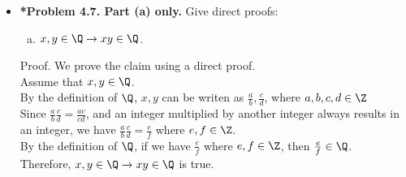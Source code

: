 \documentclass[11pt]{article}
\def\imp{\rightarrow}
\begin{document}
\begin{itemize}
\vspace{0.1in}

\item \textbf{*Problem 4.7. Part (a) only.}
  Give direct proofs:
  \begin{enumerate}[(a)]
  \item $x,y\in\Q\imp xy\in\Q$.
  \end{enumerate}
Proof. We prove the claim using a direct proof.
\\Assume that $x,y\in\Q$.
\\By the definition of $\Q$, $x,y$ can be writen as $\frac{a}{b},\frac{c}{d}$, where $a,b,c,d\in\Z$
\\Since $\frac{a}{b}\frac{c}{d}=\frac{ac}{cd}$, and an integer multiplied by another integer always results in an integer, we have  $\frac{a}{b}\frac{c}{d}=\frac{e}{f}$ where $e,f\in\Z$.
\\By the definition of $\Q$, if we have $\frac{e}{f}$ where $e,f\in\Z$, then $\frac{e}{f}\in\Q$.
\\Therefore, $x,y\in\Q\imp xy\in\Q$ is true.


\end{itemize}
\end{document}
